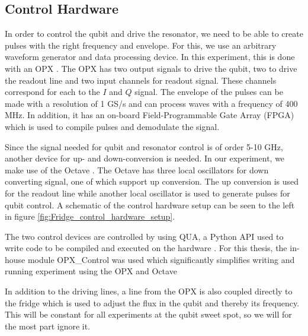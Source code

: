 \subsection{Control Hardware}
In order to control the qubit and drive the resonator, we need to be able to create pulses with the right frequency and envelope. For this, we use an arbitrary waveform generator and data processing device. In this experiment, this is done with an OPX \cite{noauthor_opx_nodate}. The OPX has two output signals to drive the qubit, two to drive the readout line and two input channels for readout signal. These channels correspond for each to the $I$ and $Q$ signal. The envelope of the pulses can be made with a resolution of 1 GS/s and can process waves with a frequency of 400 MHz. In addition, it has an on-board Field-Programmable Gate Array (FPGA) which is used to compile pulses and demodulate the signal. 

Since the signal needed for qubit and resonator control is of order 5-10 GHz, another device for up- and down-conversion is needed. In our experiment, we make use of the Octave \cite{noauthor_octave_nodate}. The Octave has three local oscillators for down converting signal, one of which support up conversion. The up conversion is used for the readout line while another local oscillator is used to generate pulses for qubit control. A schematic of the control hardware setup can be seen to the left in figure \ref{fig:Fridge_control_hardware_setup}.

The two control devices are controlled by using QUA, a Python API used to write code to be compiled and executed on the hardware \cite{ltd_qua_nodate}. For this thesis, the in-house module OPX\_Control\cite{hastrup_cqed_nodate} was used which  significantly simplifies writing and running experiment using the OPX and Octave 

In addition to the driving lines, a line from the OPX is also coupled directly to the fridge which is used to adjust the flux in the qubit and thereby its frequency. This will be constant for all experiments at the qubit sweet spot, so we will for the most part ignore it. 


